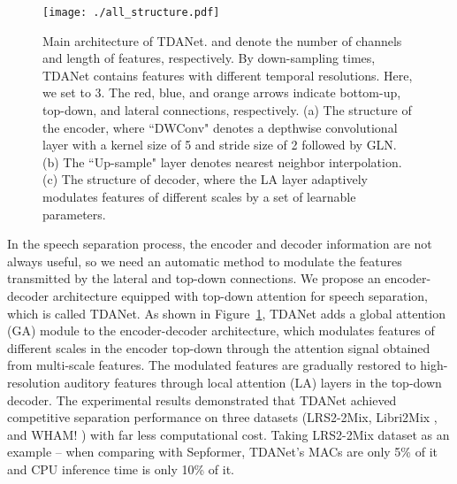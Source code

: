 \documentclass{article} \usepackage{iclr2023_conference,times}
\begin{document}
\begin{figure}[ht]
\centering
\texttt{[image: ./all\_structure.pdf]}
\caption{Main architecture of TDANet.  and  denote the number of channels and length of features, respectively. By down-sampling  times, TDANet contains  features with different temporal resolutions. Here, we set  to 3. The red, blue, and orange arrows indicate bottom-up, top-down, and lateral connections, respectively. (a) The structure of the encoder, where ``DWConv" denotes a depthwise convolutional layer with a kernel size of 5 and stride size of 2 followed by GLN. (b) The ``Up-sample" layer denotes nearest neighbor interpolation. (c) The structure of decoder, where the LA layer adaptively modulates features of different scales by a set of learnable parameters.}
\label{fig:all_structure}
\end{figure}

In the speech separation process, the encoder and decoder information are not always useful, so we need an automatic method to modulate the features transmitted by the lateral and top-down connections. We propose an encoder-decoder architecture equipped with top-down attention for speech separation, which is called TDANet. 
As shown in Figure~\ref{fig:all_structure}, TDANet adds a global attention (GA) module to the encoder-decoder architecture, which modulates features of different scales in the encoder top-down through the attention signal obtained from multi-scale features.  The modulated features are gradually restored to high-resolution auditory features through local attention (LA) layers in the top-down decoder.
The experimental results demonstrated that TDANet achieved competitive separation performance on three datasets (LRS2-2Mix, Libri2Mix \citep{cosentino2020librimix}, and WHAM! \citep{Wichern2019}) with far less computational cost. Taking LRS2-2Mix dataset as an example -- when comparing with Sepformer, TDANet's MACs are only 5\% of it and CPU inference time is only 10\% of it.
\end{document}
